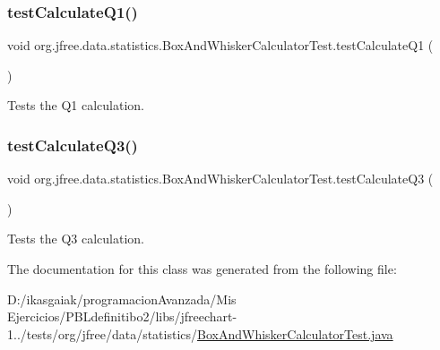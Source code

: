 \subsubsection{\texorpdfstring{test\+Calculate\+Q1()}{testCalculateQ1()}}
{\footnotesize\ttfamily void org.\+jfree.\+data.\+statistics.\+Box\+And\+Whisker\+Calculator\+Test.\+test\+Calculate\+Q1 (\begin{DoxyParamCaption}{ }\end{DoxyParamCaption})}

Tests the Q1 calculation. \mbox{\label{classorg_1_1jfree_1_1data_1_1statistics_1_1_box_and_whisker_calculator_test_afbb342f3101188b1703470971e86a8c3}} 
\subsubsection{\texorpdfstring{test\+Calculate\+Q3()}{testCalculateQ3()}}
{\footnotesize\ttfamily void org.\+jfree.\+data.\+statistics.\+Box\+And\+Whisker\+Calculator\+Test.\+test\+Calculate\+Q3 (\begin{DoxyParamCaption}{ }\end{DoxyParamCaption})}

Tests the Q3 calculation. 

The documentation for this class was generated from the following file\+:\begin{DoxyCompactItemize}
\item 
D\+:/ikasgaiak/programacion\+Avanzada/\+Mis Ejercicios/\+P\+B\+Ldefinitibo2/libs/jfreechart-\/1../tests/org/jfree/data/statistics/\mbox{\hyperlink{_box_and_whisker_calculator_test_8java}{Box\+And\+Whisker\+Calculator\+Test.\+java}}\end{DoxyCompactItemize}
